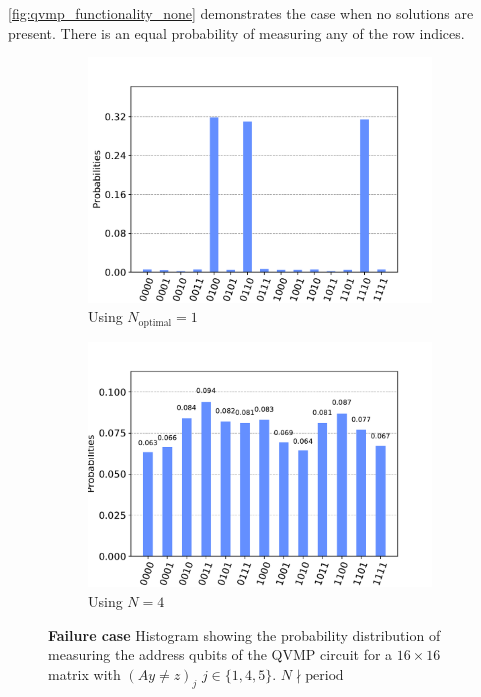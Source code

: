 \documentclass[11pt]{article}
\theoremstyle{definition}
\theoremstyle{remark}
\begin{document}
\cref{fig:qvmp_functionality_none} demonstrates the case when no solutions are
present. There is an equal probability of measuring any of the row indices.

\begin{figure}[h!]
  \centering
  \begin{subfigure}{0.48\textwidth}
    \centering
    \includegraphics[width=\textwidth]{../../results/figures/qvmp_functionality_pfound_known__1.pdf}
    \caption{Using $N_{\text{optimal}} = 1$}
  \end{subfigure}
  \begin{subfigure}{0.48\textwidth}
    \centering
    \includegraphics[width=\textwidth]{../../results/figures/qvmp_functionality_pfound_unknown__1.pdf}
    \caption{Using $N = 4$}
  \end{subfigure}
  \caption{\textbf{Failure case} Histogram showing the probability distribution
  of measuring the address qubits of the QVMP circuit for a $16 \times 16$
  matrix with $(Ay \neq z)_j$ $j \in \{1, 4, 5\}$. $N \nmid \text{period}$}
  \label{fig:qvmp_functionality_pfound_unknown__1}
\end{figure}
\end{document}
